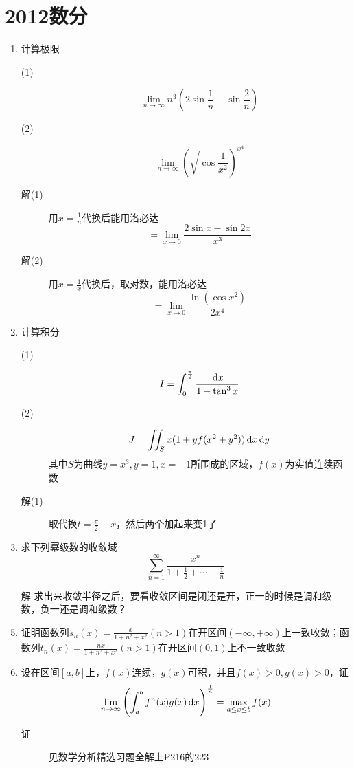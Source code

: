 \section{2012数分}
\begin{enumerate}
\item 计算极限
\begin{description}
\item[(1)]
\[
\lim_{n \to \infty} n^3\left(2\sin\frac{1}{n}-\sin\frac{2}{n} \right)
\]
\item[(2)]
\[
\lim_{n \to \infty} \left(\sqrt{\cos\frac{1}{x^2}}\right)^{x^4}
\]
\item[解(1)] 用$x=\frac{1}{n}$代换后能用洛必达
\[
=\lim_{x \to 0} \frac{2\sin x-\sin 2x}{x^3}
\]
\item[解(2)] 用$x=\frac{1}{x}$代换后，取对数，能用洛必达
\[
=\lim_{x \to 0} \frac{\ln (\cos x^2)}{2x^4}
\]
\end{description}

\item 计算积分
\begin{description}
\item[(1)]
\[
I=\int_0^{\frac{\pi}{2}} \frac{\,\mathrm{d} x}{1+\tan^3 x}
\]
\item[(2)]
\[
J=\iint_S x(1+yf(x^2+y^2))\,\mathrm{d} x \,\mathrm{d} y
\]
其中$S$为曲线$y=x^3,y=1,x=-1$所围成的区域，$f(x)$为实值连续函数
\item[解(1)] 取代换$t = \frac{\pi}{2} - x$，然后两个加起来变1了

\end{description}

\item 求下列幂级数的收敛域
\[
\sum_{n=1}^{\infty} \frac{x^n}{1+\frac{1}{2}+\cdots +\frac{1}{n}}
\]
\item[解] 求出来收敛半径之后，要看收敛区间是闭还是开，正一的时候是调和级数，负一还是调和级数？

\item 证明函数列$s_n(x)=\frac{x}{1+n^2+x^2}(n>1)$在开区间$(-\infty,+\infty)$上一致收敛；函数列$t_n(x)=\frac{nx}{1+n^2+x^2}(n>1)$在开区间$(0,1)$上不一致收敛

\item 设在区间$[a,b]$上，$f(x)$连续，$g(x)$可积，并且$f(x)>0,g(x)>0$，证
\[
\lim_{n \to \infty} \left(\int_a^b f^n(x)g(x)\,\mathrm{d} x \right)^{\frac{1}{n}} = \max_{a\leq x\leq b}f(x)
\]
\begin{description}
\item[证] 见数学分析精选习题全解上P216的223
\end{description}


\end{enumerate}
